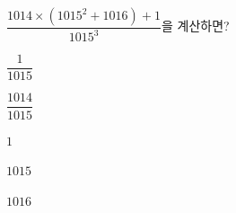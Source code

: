 $\dfrac{1014\times(1015^2+1016)+1}{1015^3}$을 계산하면?
\begin{choices32}{\rule[-3ex]{0pt}{8ex}$\dfrac{1}{1015}$}{\rule[-3ex]{0pt}{8ex}$\dfrac{1014}{1015}$}{\rule[-3ex]{0pt}{8ex}$1$}{\rule[-3ex]{0pt}{8ex}$1015$}{\rule[-3ex]{0pt}{8ex}$1016$}\end{choices32}

